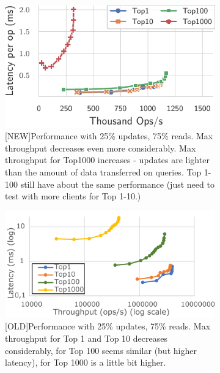 \documentclass[sigplan,10pt]{acmart}
\begin{document}
\begin{figure}[h]
	\centering
	\begin{subfigure}{.47\linewidth}
		\includegraphics[width=1\linewidth]{singleQuery/bench_top_size_0_25}
		\caption{[NEW]Performance with 25\% updates, 75\% reads. Max throughput decreases even more considerably. Max throughput for Top1000 increases - updates are lighter than the amount of data transferred on queries. Top 1-100 still have about the same performance (just need to test with more clients for Top 1-10.)}
		\label{fig:(new)bench_top_size_0_25upd}
	\end{subfigure}%
	\hspace*{3em}
	\begin{subfigure}{.47\linewidth}
		\includegraphics[width=1\linewidth]{TopKTopSize25upd_cut}
		\caption{[OLD]Performance with 25\% updates, 75\% reads. Max throughput for Top 1 and Top 10 decreases considerably, for Top 100 seems similar (but higher latency), for Top 1000 is a little bit higher.}
		\label{fig:(old)bench_top_size_0_25upd}
	\end{subfigure}
	\caption{}
\end{figure}
\end{document}
